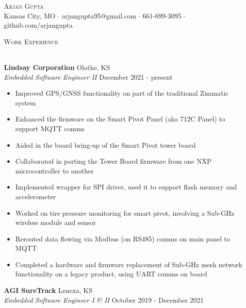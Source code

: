 \documentclass[a4paper]{article}
\newcommand{\lineunder} {
    \vspace*{-8pt} \\
    \hspace*{-18pt} \hrulefill \\
}
\newcommand{\header} [1] {
    {\hspace*{-18pt}\vspace*{6pt} \textsc{#1}}
    \vspace*{-6pt} \lineunder
}
\begin{document}
\vspace*{-40pt}

    

\vspace*{-10pt}
\begin{center}
	{\Huge \scshape {Arjan Gupta}}\\
	Kansas City, MO $\cdot$ arjangupta95@gmail.com $\cdot$ 661-699-3095 $\cdot$ github.com/arjangupta\\
\end{center}

\header{Work Experience}
\vspace{1mm}

\textbf{Lindsay Corporation} \hfill Olathe, KS\\
\textit{Embedded Software Engineer II} \hfill December 2021 - present\\
\vspace{-1mm}
\begin{itemize} \itemsep 1pt
    \item Improved GPS/GNSS functionality on part of the traditional Zimmatic system
    \item Enhanced the firmware on the Smart Pivot Panel (aka 712C Panel) to support MQTT comms
    \item Aided in the board bring-up of the Smart Pivot tower board
    \item Collaborated in porting the Tower Board firmware from one NXP microcontroller to another
    \item Implemented wrapper for SPI driver, used it to support flash memory and accelerometer 
    \item Worked on tire pressure monitoring for smart pivot, involving a Sub-GHz wireless module and sensor
    \item Rerouted data flowing via Modbus (on RS485) comms on main panel to MQTT
    \item Completed a hardware and firmware replacement of Sub-GHz mesh network functionality on a legacy product, using UART comms on board
\end{itemize}
\textbf{AGI SureTrack} \hfill Lenexa, KS\\
\textit{Embedded Software Engineer I \& II} \hfill October 2019 - December 2021\\
\vspace{-1mm}
\end{document}
